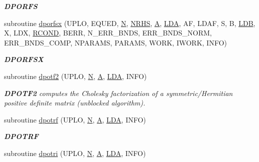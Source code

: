 \begin{DoxyCompactItemize}
\begin{DoxyCompactList}\small\item\em {\bfseries D\+P\+O\+R\+F\+S} \end{DoxyCompactList}\item 
subroutine \hyperlink{group__doublePOcomputational_ga4285835f23c2c12a427d63d29251251d}{dporfsx} (U\+P\+L\+O, E\+Q\+U\+E\+D, \hyperlink{polmisc_8c_a0240ac851181b84ac374872dc5434ee4}{N}, \hyperlink{example__user_8c_aa0138da002ce2a90360df2f521eb3198}{N\+R\+H\+S}, \hyperlink{classA}{A}, \hyperlink{example__user_8c_ae946da542ce0db94dced19b2ecefd1aa}{L\+D\+A}, A\+F, L\+D\+A\+F, S, B, \hyperlink{example__user_8c_a50e90a7104df172b5a89a06c47fcca04}{L\+D\+B}, X, L\+D\+X, \hyperlink{superlu__enum__consts_8h_af00a42ecad444bbda75cde1b64bd7e72a9b5c151728d8512307565994c89919d5}{R\+C\+O\+N\+D}, B\+E\+R\+R, N\+\_\+\+E\+R\+R\+\_\+\+B\+N\+D\+S, E\+R\+R\+\_\+\+B\+N\+D\+S\+\_\+\+N\+O\+R\+M, E\+R\+R\+\_\+\+B\+N\+D\+S\+\_\+\+C\+O\+M\+P, N\+P\+A\+R\+A\+M\+S, P\+A\+R\+A\+M\+S, W\+O\+R\+K, I\+W\+O\+R\+K, I\+N\+F\+O)
\begin{DoxyCompactList}\small\item\em {\bfseries D\+P\+O\+R\+F\+S\+X} \end{DoxyCompactList}\item 
subroutine \hyperlink{group__doublePOcomputational_ga7a5f5e88ba6f8d8d0382cac5c2c18019}{dpotf2} (U\+P\+L\+O, \hyperlink{polmisc_8c_a0240ac851181b84ac374872dc5434ee4}{N}, \hyperlink{classA}{A}, \hyperlink{example__user_8c_ae946da542ce0db94dced19b2ecefd1aa}{L\+D\+A}, I\+N\+F\+O)
\begin{DoxyCompactList}\small\item\em {\bfseries D\+P\+O\+T\+F2} computes the Cholesky factorization of a symmetric/\+Hermitian positive definite matrix (unblocked algorithm). \end{DoxyCompactList}\item 
subroutine \hyperlink{group__doublePOcomputational_ga2f55f604a6003d03b5cd4a0adcfb74d6}{dpotrf} (U\+P\+L\+O, \hyperlink{polmisc_8c_a0240ac851181b84ac374872dc5434ee4}{N}, \hyperlink{classA}{A}, \hyperlink{example__user_8c_ae946da542ce0db94dced19b2ecefd1aa}{L\+D\+A}, I\+N\+F\+O)
\begin{DoxyCompactList}\small\item\em {\bfseries D\+P\+O\+T\+R\+F} \end{DoxyCompactList}\item 
subroutine \hyperlink{group__doublePOcomputational_ga9dfc04beae56a3b1c1f75eebc838c14c}{dpotri} (U\+P\+L\+O, \hyperlink{polmisc_8c_a0240ac851181b84ac374872dc5434ee4}{N}, \hyperlink{classA}{A}, \hyperlink{example__user_8c_ae946da542ce0db94dced19b2ecefd1aa}{L\+D\+A}, I\+N\+F\+O)

\end{DoxyCompactItemize}
